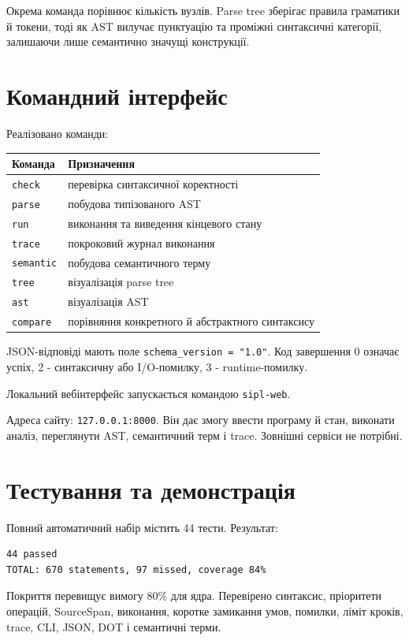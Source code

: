 \documentclass[12pt,a4paper]{article}
\newcommand{\code}[1]{\texttt{#1}}
\begin{document}
Окрема команда порівнює кількість вузлів. Parse tree зберігає правила
граматики й токени, тоді як AST вилучає пунктуацію та проміжні синтаксичні
категорії, залишаючи лише семантично значущі конструкції.

\section{Командний інтерфейс}

Реалізовано команди:

\begin{longtable}{p{28mm}p{105mm}}
\toprule
Команда & Призначення\\
\midrule
\endhead
\code{check} & перевірка синтаксичної коректності\\
\code{parse} & побудова типізованого AST\\
\code{run} & виконання та виведення кінцевого стану\\
\code{trace} & покроковий журнал виконання\\
\code{semantic} & побудова семантичного терму\\
\code{tree} & візуалізація parse tree\\
\code{ast} & візуалізація AST\\
\code{compare} & порівняння конкретного й абстрактного синтаксису\\
\bottomrule
\end{longtable}

JSON-відповіді мають поле \code{schema\_version = "1.0"}. Код завершення
0 означає успіх, 2 - синтаксичну або I/O-помилку, 3 - runtime-помилку.

Локальний вебінтерфейс запускається командою \code{sipl-web}.
\par\noindent Адреса сайту:
\code{127.0.0.1:8000}. Він дає змогу ввести програму й стан, виконати
аналіз, переглянути AST, семантичний терм і trace. Зовнішні сервіси не потрібні.

\section{Тестування та демонстрація}

Повний автоматичний набір містить 44 тести. Результат:

\begin{verbatim}
44 passed
TOTAL: 670 statements, 97 missed, coverage 84%
\end{verbatim}

Покриття перевищує вимогу 80\% для ядра. Перевірено синтаксис,
пріоритети операцій, SourceSpan, виконання, коротке замикання умов,
помилки, ліміт кроків, trace, CLI, JSON, DOT і семантичні терми.
\end{document}

